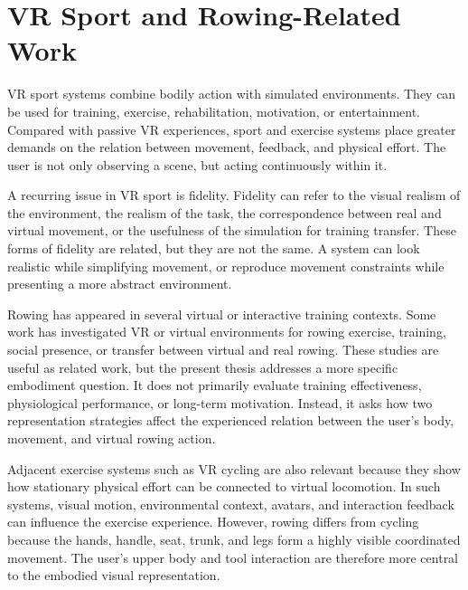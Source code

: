 \section{VR Sport and Rowing-Related Work}
\label{sec:background_vr_sport_rowing_related_work}

VR sport systems combine bodily action with simulated environments. They can be used for training, exercise, rehabilitation, motivation, or entertainment. Compared with passive VR experiences, sport and exercise systems place greater demands on the relation between movement, feedback, and physical effort. The user is not only observing a scene, but acting continuously within it.

A recurring issue in VR sport is fidelity. Fidelity can refer to the visual realism of the environment, the realism of the task, the correspondence between real and virtual movement, or the usefulness of the simulation for training transfer. These forms of fidelity are related, but they are not the same. A system can look realistic while simplifying movement, or reproduce movement constraints while presenting a more abstract environment.

Rowing has appeared in several virtual or interactive training contexts. Some work has investigated VR or virtual environments for rowing exercise, training, social presence, or transfer between virtual and real rowing. These studies are useful as related work, but the present thesis addresses a more specific embodiment question. It does not primarily evaluate training effectiveness, physiological performance, or long-term motivation. Instead, it asks how two representation strategies affect the experienced relation between the user's body, movement, and virtual rowing action.

Adjacent exercise systems such as VR cycling are also relevant because they show how stationary physical effort can be connected to virtual locomotion. In such systems, visual motion, environmental context, avatars, and interaction feedback can influence the exercise experience. However, rowing differs from cycling because the hands, handle, seat, trunk, and legs form a highly visible coordinated movement. The user's upper body and tool interaction are therefore more central to the embodied visual representation.

